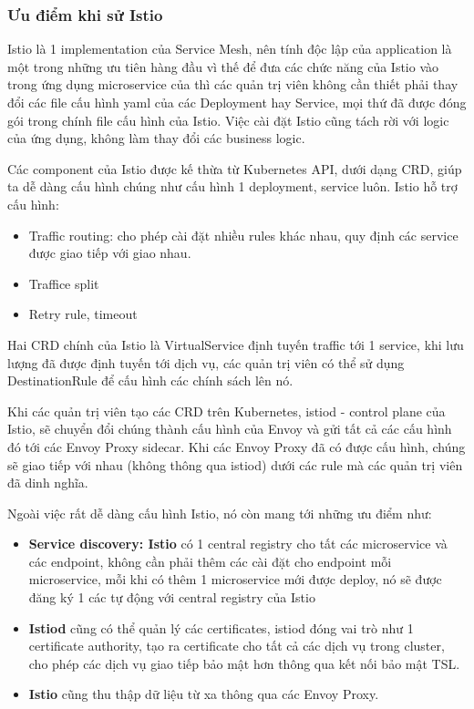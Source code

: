 \documentclass[14pt,a4paper]{book}
\begin{document}
			\subsubsection{Ưu điểm khi sử Istio}
		\hspace{0.6cm}Istio là 1 implementation của Service Mesh, nên tính độc lập của application là một trong những ưu tiên hàng đầu vì thế để đưa các chức năng của Istio vào trong ứng dụng microservice của thì các quản trị viên không cần thiết phải thay đổi các file cấu hình yaml của các Deployment hay Service, mọi thứ đã được đóng gói trong chính file cấu hình của Istio. Việc cài đặt Istio cũng tách rời với logic của ứng dụng, không làm thay đổi các business logic.
		
		Các component của Istio được kế thừa từ Kubernetes API, dưới dạng CRD, giúp ta dễ dàng cấu hình chúng như cấu hình 1 deployment, service luôn. Istio hỗ trợ cấu hình:
		\begin{itemize}
			\item Traffic routing: cho phép cài đặt nhiều rules khác nhau, quy định các service được giao tiếp với giao nhau.
			\item Traffice split
			\item Retry rule, timeout
		\end{itemize}
		
		Hai CRD chính của Istio là VirtualService định tuyến traffic tới 1 service, khi lưu lượng đã được định tuyến tới dịch vụ, các quản trị viên có thể sử dụng DestinationRule để cấu hình các chính sách lên nó.
		
		Khi các quản trị viên tạo các CRD trên Kubernetes, istiod - control plane của Istio, sẽ chuyển đổi chúng thành cấu hình của Envoy và gửi tất cả các cấu hình đó tới các Envoy Proxy sidecar. Khi các Envoy Proxy đã có được cấu hình, chúng sẽ giao tiếp với nhau (không thông qua istiod) dưới các rule mà các quản trị viên đã dinh nghĩa.
		
		Ngoài việc rất dễ dàng cấu hình Istio, nó còn mang tới những ưu điểm như:
		\begin{itemize}
			\item \textbf{Service discovery: Istio} có 1 central registry cho tất các microservice và các endpoint, không cần phải thêm các cài đặt cho endpoint mỗi microservice, mỗi khi có thêm 1 microservice mới được deploy, nó sẽ được đăng ký 1 các tự động với central registry của Istio
			\item \textbf{Istiod} cũng có thể quản lý các certificates, istiod đóng vai trò như 1 certificate authority, tạo ra certificate cho tất cả các dịch vụ trong cluster, cho phép các dịch vụ giao tiếp bảo mật hơn thông qua kết nối bảo mật TSL.
			\item \textbf{Istio} cũng thu thập dữ liệu từ xa thông qua các Envoy Proxy.
		\end{itemize}
		
\end{document}
